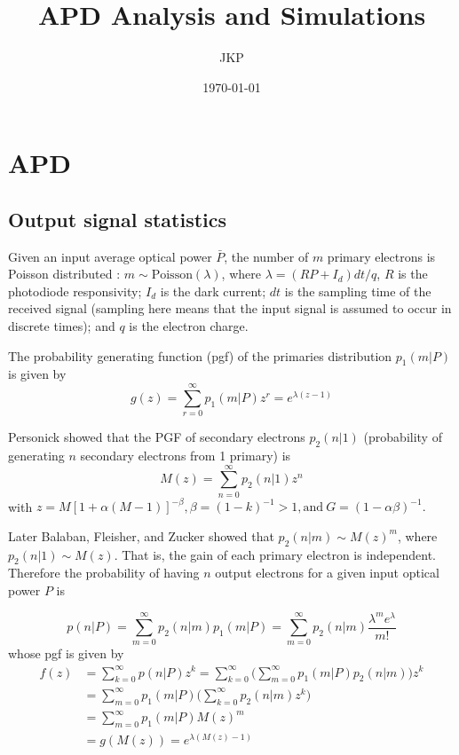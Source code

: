 \documentclass[a4paper]{article}
\title{APD Analysis and Simulations}
\author{JKP}
\date{\today}
\begin{document}
\maketitle



\section{APD}
\subsection{Output signal statistics}

Given an input average optical power $\bar{P}$, the number of $m$ primary electrons is Poisson distributed \cite{personick}: $m \sim \mathrm{Poisson}(\lambda)$, where $\lambda = (RP + I_d)dt/q$, $R$ is the photodiode responsivity; $I_d$ is the dark current; $dt$ is the sampling time of the received signal (sampling here means that the input signal is assumed to occur in discrete times); and $q$ is the electron charge.

The probability generating function (pgf) of the primaries distribution $p_1(m|P)$ is given by
\begin{equation}
g(z) = \sum_{r = 0}^{\infty} p_1(m|P)z^r = e^{\lambda(z-1)}
\end{equation}

Personick \cite{personick-comp-4methos} showed that the PGF of secondary electrons $p_2(n|1)$ (probability of generating $n$ secondary electrons from 1 primary) is
\begin{equation}
M(z) = \sum_{n = 0}^{\infty} p_2(n|1)z^n
\end{equation}
with $z = M[1 + \alpha(M-1)]^{-\beta}, \beta= (1-k)^{-1} > 1, \text{and}~G = (1-\alpha\beta)^{-1}.$

Later Balaban, Fleisher, and Zucker \cite{gain-distribution} showed that $p_2(n|m) \sim M(z)^m$, where $p_2(n|1) \sim M(z)$. That is, the gain of each primary electron is independent.
Therefore the probability of having $n$ output electrons for a given input optical power $P$ is

\begin{equation} \label{output-probability}
p(n|P) = \sum_{m = 0}^{\infty} p_2(n|m)p_1(m|P) =  \sum_{m = 0}^{\infty} p_2(n|m) \frac{\lambda^m e^{\lambda}}{m!}
\end{equation}
whose pgf is given by
\begin{align}
f(z) &= \sum_{k = 0}^{\infty}p(n|P)z^k = \sum_{k=0}^{\infty}\bigg(\sum_{m=0}^{\infty}p_1(m|P)p_2(n|m)\bigg)z^k \\ \nonumber
& = \sum_{m=0}^{\infty}p_1(m|P)\bigg(\sum_{k=0}^{\infty}p_2(n|m)z^k\bigg) \\ \nonumber
& = \sum_{m=0}^{\infty}p_1(m|P)M(z)^m \\
& = g(M(z)) = e^{\lambda(M(z)-1)}
\end{align}
\end{document}
